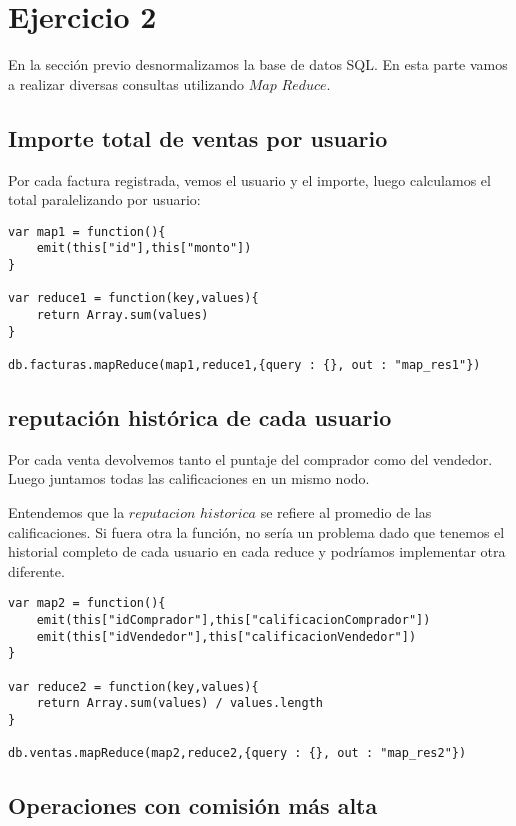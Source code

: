 \section{Ejercicio 2}

En la sección previo desnormalizamos la base de datos SQL. En esta parte vamos a realizar diversas consultas utilizando $Map$ $Reduce$.

\subsection{Importe total de ventas por usuario}

Por cada factura registrada, vemos el usuario y el importe, luego calculamos el total paralelizando por usuario: \\

\begin{verbatim}
var map1 = function(){
    emit(this["id"],this["monto"])
}

var reduce1 = function(key,values){
    return Array.sum(values)
}

db.facturas.mapReduce(map1,reduce1,{query : {}, out : "map_res1"})
\end{verbatim}

\subsection{reputación histórica de cada usuario}
Por cada venta devolvemos tanto el puntaje del comprador como del vendedor. Luego juntamos todas las calificaciones en un mismo nodo.


Entendemos que la $reputacion$ $historica$ se refiere al promedio de las calificaciones. Si fuera otra la función, no sería un problema dado que tenemos el historial completo de cada usuario en cada reduce y podríamos implementar otra diferente.

\begin{verbatim}
var map2 = function(){
    emit(this["idComprador"],this["calificacionComprador"])
    emit(this["idVendedor"],this["calificacionVendedor"])
}

var reduce2 = function(key,values){
    return Array.sum(values) / values.length
}

db.ventas.mapReduce(map2,reduce2,{query : {}, out : "map_res2"})
\end{verbatim}

\subsection{Operaciones con comisión más alta}


